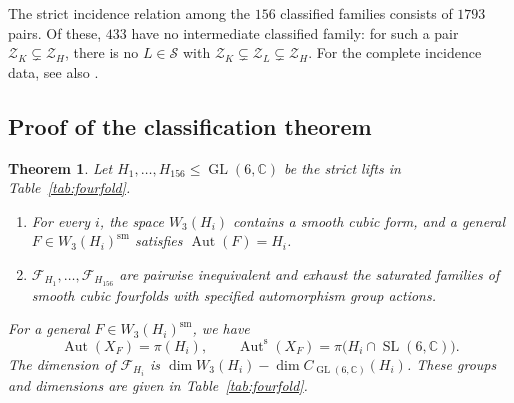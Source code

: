 \documentclass[12pt]{amsart}
\numberwithin{equation}{section}
\theoremstyle{plain}
\newtheorem{thm}{Theorem}[section]
\theoremstyle{definition}
\theoremstyle{remark}
\newcommand{\CC}{\mathbb C}
\DeclareMathOperator{\Aut}{Aut}
\DeclareMathOperator{\GL}{GL}
\DeclareMathOperator{\SL}{SL}
\newcommand{\Auts}{\Aut^{\mathrm s}}
\begin{document}
The strict incidence relation among the $156$ classified families
consists of $1793$ pairs. Of these, $433$ have no intermediate classified
family: for such a pair
$\mathcal Z_K\subsetneq\mathcal Z_H$, there is no $L\in\mathscr S$
with $\mathcal Z_K\subsetneq\mathcal Z_L\subsetneq\mathcal Z_H$.
For the complete incidence data, see also .

\subsection{Proof of the classification theorem}
\label{subsec:fourfold-classification-theorem}
\begin{thm}\label{thm:fourfold-classification}
Let $H_1,\ldots,H_{156}\leq\GL(6,\CC)$ be the strict lifts in
Table~\ref{tab:fourfold}.
\begin{enumerate}
\item For every $i$, the space $W_3(H_i)$ contains a smooth cubic form,
and a general $F\in W_3(H_i)^{\mathrm{sm}}$ satisfies $\Aut(F)=H_i$.
\item $\mathcal F_{H_1},\ldots,\mathcal F_{H_{156}}$ are
pairwise inequivalent and exhaust the saturated families of smooth
cubic fourfolds with specified automorphism group actions.
\end{enumerate}


For a general $F\in W_3(H_i)^{\mathrm{sm}}$, we have
\[
\Aut(X_F)=\pi(H_i),\qquad
\Auts(X_F)=\pi\bigl(H_i\cap\SL(6,\CC)\bigr).
\]
The dimension of $\mathcal F_{H_i}$ is
$\dim W_3(H_i)-\dim C_{\GL(6,\CC)}(H_i)$.
These groups and dimensions are given in Table~\ref{tab:fourfold}.
\end{thm}
\end{document}
